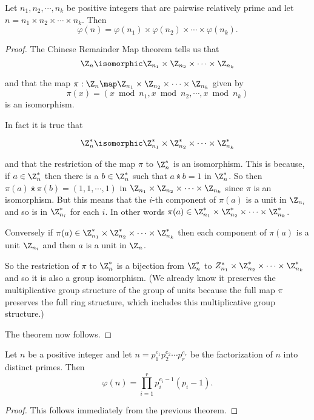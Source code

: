 \documentclass[oneside,12pt]{amsart}
\begin{document}
\begin{theorem}
Let $n_1,n_2,\cdots,n_k$ be positive integers that are pairwise relatively prime and let 
$n=n_1\times n_2 \times \cdots \times n_k$. Then
$$\varphi(n) = \varphi(n_1) \times \varphi(n_2) \times \cdots \times \varphi(n_k).$$
\end{theorem}
\begin{proof}
The Chinese Remainder Map theorem tells us that
$$\Z_n \isomorphic \Z_{n_1} \times \Z_{n_2} \times \cdots \times \Z_{n_k}$$

and that the map $\pi:\Z_n \map \Z_{n_1} \times \Z_{n_2} \times \cdots \times \Z_{n_k}$ given by
$$\pi(x) = \left(x \bmod n_1, x\bmod n_2, \cdots , x\bmod n_k\right)$$
is an isomorphism.

In fact it is true that

$$\Z^*_n \isomorphic \Z^*_{n_1} \times \Z^*_{n_2} \times \cdots \times \Z^*_{n_k}$$

and that the restriction of the map $\pi$ to $\Z^*_n$ is an isomorphism.
This is because, if $a\in\Z^*_n$ then there is a $b\in \Z^*_n$ such that $a\dottimes b = 1$ in $\Z^*_n$.
So then $\pi(a) \dottimes \pi(b) = (1,1,\cdots, 1)$ in $\Z_{n_1} \times \Z_{n_2} \times \cdots \times \Z_{n_k}$ since
$\pi$ is an isomorphism. But this means that the $i$-th component of $\pi(a)$ is a unit in $\Z_{n_i}$ and so is in $\Z^*_{n_i}$ for
each $i$. In other words $\pi(a)\in \Z^*_{n_1} \times \Z^*_{n_2} \times \cdots \times \Z^*_{n_k}$.

Conversely if $\pi(a)\in \Z^*_{n_1} \times \Z^*_{n_2} \times \cdots \times \Z^*_{n_k}$ then each component of
 $\pi(a)$ is a unit $\Z_{n_i}$ and then $a$ is a unit in $\Z_n$.

 So the restriction of $\pi$ to $\Z^*_n$ is a bijection from $\Z^*_n$ to $Z^*_{n_1} \times \Z^*_{n_2} \times \cdots \times \Z^*_{n_k}$
 and so it is also a group isomorphism. (We already know it preserves the multiplicative group structure of
 the group of units because the full map $\pi$ preserves the full ring structure, which includes this multiplicative group structure.)

 The theorem now follows.
\end{proof}

\begin{theorem}
Let $n$ be a positive integer and let $n=p_1^{e_1}p_2^{e_2}\cdots p_r^{e_r}$ be the factorization
of $n$ into distinct primes. Then
$$\varphi(n) = \prod_{i=1}^r p_i^{e_i-1}(p_i-1).$$
\end{theorem}
\begin{proof}
This follows immediately from the previous theorem.
\end{proof}
\end{document}
